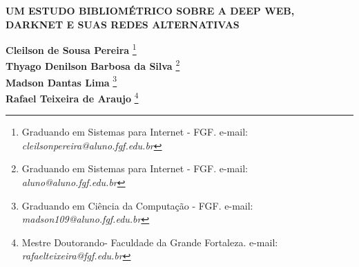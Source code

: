 \documentclass[12pt]{article}
\begin{document}

%



\begin{center}
\textbf{\Large{UM ESTUDO BIBLIOMÉTRICO SOBRE A DEEP WEB, DARKNET E SUAS REDES ALTERNATIVAS}}\\
\end{center}

\vspace*{0.2cm}

\begin{flushright}
 {\bf Cleilson de Sousa Pereira} \footnote[1]{Graduando em Sistemas para Internet - FGF. e-mail: \it cleilsonpereira@aluno.fgf.edu.br}  \\
 {\bf Thyago Denilson Barbosa da Silva} \footnote[2]{Graduando em Sistemas para Internet - FGF. e-mail: \it aluno@aluno.fgf.edu.br}  \\
  {\bf Madson Dantas Lima} \footnote[3]{Graduando em Ciência da Computação - FGF. e-mail: \it madson109@aluno.fgf.edu.br}  \\
   {\bf Rafael Teixeira de Araujo} \footnote[4]{Mestre Doutorando- Faculdade da Grande Fortaleza. e-mail: \it rafaelteixeira@fgf.edu.br}   \\
\end{flushright}

\vspace*{0.5cm}

\end{document}
